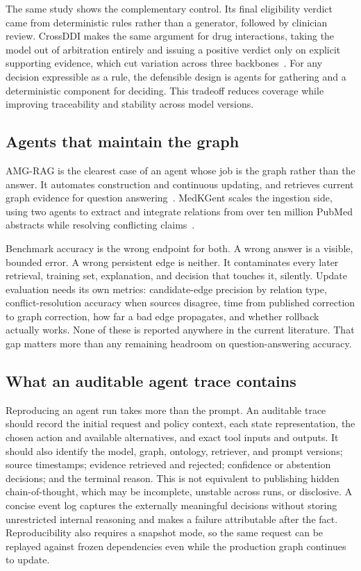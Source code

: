 The same study shows the complementary control. Its final eligibility verdict came from deterministic rules rather than a generator, followed by clinician review. CrossDDI makes the same argument for drug interactions, taking the model out of arbitration entirely and issuing a positive verdict only on explicit supporting evidence, which cut variation across three backbones~\cite{wang2026crossddi}. For any decision expressible as a rule, the defensible design is agents for gathering and a deterministic component for deciding. This tradeoff reduces coverage while improving traceability and stability across model versions.

\subsection{Agents that maintain the graph}

AMG-RAG is the clearest case of an agent whose job is the graph rather than the answer. It automates construction and continuous updating, and retrieves current graph evidence for question answering~\cite{rezaei2025amgrag}. MedKGent scales the ingestion side, using two agents to extract and integrate relations from over ten million PubMed abstracts while resolving conflicting claims~\cite{zhang2025medkgent}.

Benchmark accuracy is the wrong endpoint for both. A wrong answer is a visible, bounded error. A wrong persistent edge is neither. It contaminates every later retrieval, training set, explanation, and decision that touches it, silently. Update evaluation needs its own metrics: candidate-edge precision by relation type, conflict-resolution accuracy when sources disagree, time from published correction to graph correction, how far a bad edge propagates, and whether rollback actually works. None of these is reported anywhere in the current literature. That gap matters more than any remaining headroom on question-answering accuracy.

\subsection{What an auditable agent trace contains}

Reproducing an agent run takes more than the prompt. An auditable trace should record the initial request and policy context, each state representation, the chosen action and available alternatives, and exact tool inputs and outputs. It should also identify the model, graph, ontology, retriever, and prompt versions; source timestamps; evidence retrieved and rejected; confidence or abstention decisions; and the terminal reason. This is not equivalent to publishing hidden chain-of-thought, which may be incomplete, unstable across runs, or disclosive. A concise event log captures the externally meaningful decisions without storing unrestricted internal reasoning and makes a failure attributable after the fact. Reproducibility also requires a snapshot mode, so the same request can be replayed against frozen dependencies even while the production graph continues to update.

